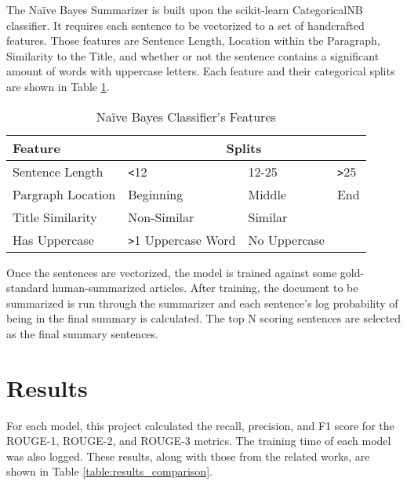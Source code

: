 \documentclass{IEEEtran}
\begin{document}
The Na\"{i}ve Bayes Summarizer is built upon the scikit-learn CategoricalNB \cite{scikit-learn_naive_bayes} classifier. It requires each sentence to be vectorized to a set of handcrafted features. Those features are Sentence Length, Location within the Paragraph, Similarity to the Title, and whether or not the sentence contains a significant amount of words with uppercase letters. Each feature and their categorical splits are shown in Table \ref{table:nb_features}.

\begin{table}[h]
\centering
\caption{Na\"{i}ve Bayes Classifier's Features}
\begin{tabular}{|l|l|l|l|}
\hline
Feature  & \multicolumn{3}{|c|}{Splits} \\ \hline
Sentence Length  & \verb|<|12  & 12-25  & \verb|>|25 \\ \hline
Pargraph Location  & Beginning  & Middle  & End \\ \hline
Title Similarity  & Non-Similar  & Similar  & \\ \hline
Has Uppercase  & \verb|>|1 Uppercase Word  & No Uppercase & \\ \hline
\end{tabular}
\label{table:nb_features}
\end{table}

Once the sentences are vectorized, the model is trained against some gold-standard human-summarized articles. After training, the document to be summarized is run through the summarizer and each sentence's log probability of being in the final summary is calculated. The top N scoring sentences are selected as the final summary sentences.

\section{Results}
For each model, this project calculated the recall, precision, and F1 score for the ROUGE-1, ROUGE-2, and ROUGE-3 metrics. The training time of each model was also logged. These results, along with those from the related works, are shown in Table \ref{table:results_comparison}.
\end{document}
